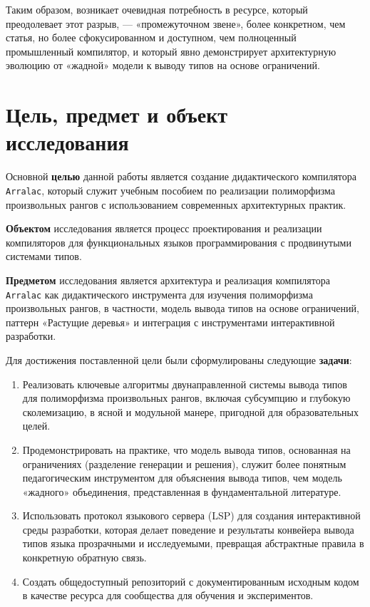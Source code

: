 Таким образом, возникает очевидная потребность в ресурсе, который преодолевает этот разрыв, — «промежуточном звене», более конкретном, чем статья, но более сфокусированном и доступном, чем полноценный промышленный компилятор, и который явно демонстрирует архитектурную эволюцию от «жадной» модели к выводу типов на основе ограничений.

\chapter[Цель, предмет и объект исследования]{Цель, предмет и объект \\ исследования}
Основной \textbf{целью} данной работы является создание дидактического компилятора \texttt{Arralac}, который служит учебным пособием по реализации полиморфизма произвольных рангов с использованием современных архитектурных практик.

\textbf{Объектом} исследования является процесс проектирования и реализации компиляторов для функциональных языков программирования с продвинутыми системами типов.

\textbf{Предметом} исследования является архитектура и реализация компилятора \texttt{Arralac} как дидактического инструмента для изучения полиморфизма произвольных рангов, в частности, модель вывода типов на основе ограничений, паттерн «Растущие деревья» и интеграция с инструментами интерактивной разработки.

Для достижения поставленной цели были сформулированы следующие \textbf{задачи}:
\begin{enumerate}
    \item Реализовать ключевые алгоритмы двунаправленной системы вывода типов для полиморфизма произвольных рангов, включая субсумпцию и глубокую сколемизацию, в ясной и модульной манере, пригодной для образовательных целей.
    \item Продемонстрировать на практике, что модель вывода типов, основанная на ограничениях (разделение генерации и решения), служит более понятным педагогическим инструментом для объяснения вывода типов, чем модель «жадного» объединения, представленная в фундаментальной литературе.
    \item Использовать протокол языкового сервера (LSP) для создания интерактивной среды разработки, которая делает поведение и результаты конвейера вывода типов языка прозрачными и исследуемыми, превращая абстрактные правила в конкретную обратную связь.
    \item Создать общедоступный репозиторий с документированным исходным кодом \cite{deemp-arbitrary-rank-tutorial} в качестве ресурса для сообщества для обучения и экспериментов.
\end{enumerate}

